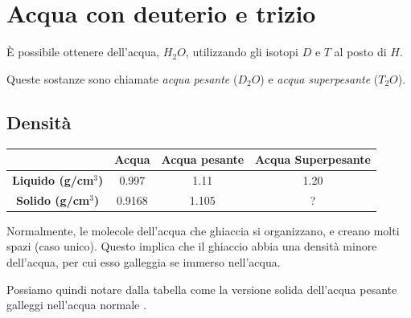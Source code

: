 \documentclass[a4paper]{article}
\begin{document}
\section{Acqua con deuterio e trizio}

È possibile ottenere dell'acqua, \(H_2O\), utilizzando gli isotopi \(D\) e \(T\) al posto di \(H\).

Queste sostanze sono chiamate \textit{acqua pesante} (\(D_2O\)) e
\textit{acqua superpesante} (\(T_2O\)).

\subsection{Densità}

\begin{center}
    \bgroup{}
    \def\arraystretch{1.25}
    \begin{tabular}{ |c|c|c|c| }
        \hline
        & \textbf{Acqua} & \textbf{Acqua pesante} & \textbf{Acqua Superpesante} \\
        \hline
        \textbf{Liquido (g/cm\(^3\))} & 0.997 & 1.11 & 1.20 \\
        \hline
        \textbf{Solido (g/cm\(^3\))} & 0.9168 & 1.105 & ? \\
        \hline
    \end{tabular}
    \egroup{}
\end{center}

Normalmente, le molecole dell'acqua che ghiaccia si organizzano, e creano molti spazi (caso unico).
Questo implica che il ghiaccio abbia una densità minore dell'acqua, per cui esso galleggia se immerso nell'acqua.

Possiamo quindi notare dalla tabella come la versione solida dell'acqua pesante galleggi
nell'acqua normale \cite{deuterated-water}.

\nocite{*} %

\printbibliography
\end{document}
